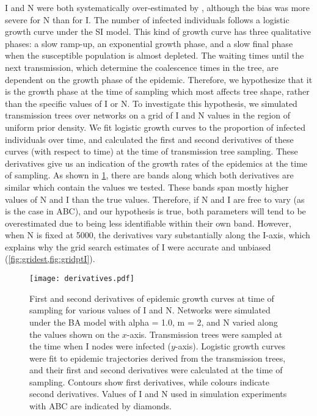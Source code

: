\gls{I} and \gls{N} were both systematically over-estimated by
, although the bias was more severe for \gls{N} than for
\gls{I}. The number of infected individuals follows a logistic growth curve
under the \gls{SI} model. This kind of growth curve has three qualitative
phases: a slow ramp-up, an exponential growth phase, and a slow final phase
when the susceptible population is almost depleted. The waiting times until the
next transmission, which determine the coalescence times in the tree, are
dependent on the growth phase of the epidemic. Therefore, we hypothesize that
it is the growth phase at the time of sampling which most affects tree shape,
rather than the specific values of \gls{I} or \gls{N}. To investigate this
hypothesis, we simulated transmission trees over networks on a grid of \gls{I}
and \gls{N} values in the region of uniform prior density. We fit logistic
growth curves to the proportion of infected individuals over time, and
calculated the first and second derivatives of these curves (with respect to
time) at the time of transmission tree sampling. These derivatives give us an
indication of the growth rates of the epidemics at the time of sampling. As
shown in \cref{fig:derivs}, there are bands along which both derivatives are
similar which contain the values we tested. These bands span mostly higher
values of \gls{N} and \gls{I} than the true values. Therefore, if \gls{N} and
\gls{I} are free to vary (as is the case in \gls{ABC}), and our hypothesis is
true, both parameters will tend to be overestimated due to being less
identifiable within their own band. However, when \gls{N} is fixed at 5000, the
derivatives vary substantially along the \gls{I}-axis, which explains why
the grid search estimates of \gls{I} were accurate and unbiased
(\cref{fig:gridest,fig:gridptI}). 

\begin{figure}[ht]
  \centering
  \texttt{[image: derivatives.pdf]}
  \caption[
    First and second time derivatives of epidemic growth curves at time of
    sampling for various values of $I$ and $N$.
  ]{
    First and second  derivatives of epidemic growth curves at time
    of sampling for various values of \gls{I} and \gls{N}. Networks were
    simulated under the \gls{BA} model with \gls{alpha} = 1.0, \gls{m} = 2, and
    \gls{N} varied along the values shown on the $x$-axis. Transmission trees
    were sampled at the time when \gls{I} nodes were infected ($y$-axis).
    Logistic growth curves were fit to epidemic trajectories derived from the
    transmission trees, and their first and second derivatives were calculated
    at the time of sampling. Contours show first derivatives, while colours
    indicate second derivatives. Values of \gls{I} and \gls{N} used in
    simulation experiments with \gls{ABC} are indicated by diamonds.
  }
  \label{fig:derivs}
\end{figure}

